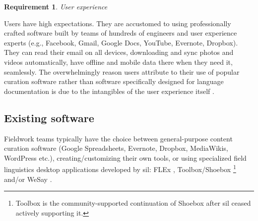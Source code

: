 \documentclass[11pt]{article}
\newcommand{\smalltodo}[2][]
    {\todo[caption={#2}, #1]
    {\tiny#2\normalsize}}
\newtheorem{requirement}{Requirement}
\begin{document}



\begin{requirement}
	\label{req:experience}
       User experience
\end{requirement}


Users have high expectations. They are accustomed to using professionally crafted
software built by teams of hundreds of engineers and user experience experts
(e.g., Facebook, Gmail, Google Docs, YouTube, Evernote, Dropbox). They can read
their email on all devices, downloading and sync photos and videos
automatically, have offline and mobile data there when they need it,
seamlessly. 
The overwhelmingly  reason users attribute to their use of popular curation software rather than software specifically designed for language documentation is due to the intangibles of the user experience itself  \cite{lingsync:2012}.




\subsection{Existing software}
\label{sec:existing-software}

Fieldwork teams typically have the choice between general-purpose content
curation software (Google Spreadsheets, Evernote, Dropbox, MediaWikis,
WordPress etc.), creating/customizing their own tools, or using specialized
field linguistics desktop applications developed by \gls{sil}:  FLEx
\cite{sil-flex}, Toolbox/Shoebox%
\footnote{Toolbox is the community-supported continuation of Shoebox after
    \gls{sil} ceased actively supporting it.} %
\cite{sil-toolbox-info} and/or WeSay \cite{WeSay:2007:Online}.
\end{document}
